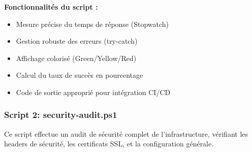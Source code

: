 \documentclass[11pt,a4paper]{report}
\begin{document}
\textbf{Fonctionnalités du script :}
\begin{itemize}
    \item Mesure précise du temps de réponse (Stopwatch)
    \item Gestion robuste des erreurs (try-catch)
    \item Affichage colorisé (Green/Yellow/Red)
    \item Calcul du taux de succès en pourcentage
    \item Code de sortie approprié pour intégration CI/CD
\end{itemize}

\subsubsection{Script 2: security-audit.ps1}

Ce script effectue un audit de sécurité complet de l'infrastructure, vérifiant les headers de sécurité, les certificats SSL, et la configuration générale.
\end{document}
